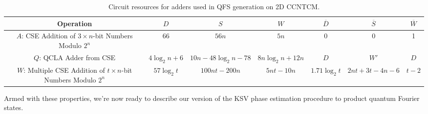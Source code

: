 \begin{table}[hbt!]
\begin{tabular}{|c|c|c|c|c|c|c|}
\hline
Operation & $D$ & $S$ & $W$ & $\overline{D}$ & $\overline{S}$ & $\overline{W}$ \\
\hline
$A$: CSE Addition of $3\times n$-bit Numbers Modulo $2^n$ & $66$ & $56n$ & $5n$ & 0 & 0 & 1 \\
$Q$: QCLA Adder from CSE & $4\log_2 n + 6$ & $10n - 48\log_2 n - 78$ & $8n \log_2 n + 12n$ & $D$ & $W'$ & $D$  \\
$W$: Multiple CSE Addition of $t\times n$-bit Numbers Modulo $2^n$ & $57\log_2 t$ & $100nt - 200n$ & $5nt - 10n$ & $1.71\log_2 t$ & $2nt + 3t - 4n - 6$ & $t-2$
\end{tabular}
\caption{Circuit resources for adders used in QFS generation on \textsf{2D CCNTCM}.}
\label{tab:qfs-adder}
\end{table}

Armed with these properties, we're now ready to describe our version of the
KSV phase estimation procedure to product quantum Fourier states.